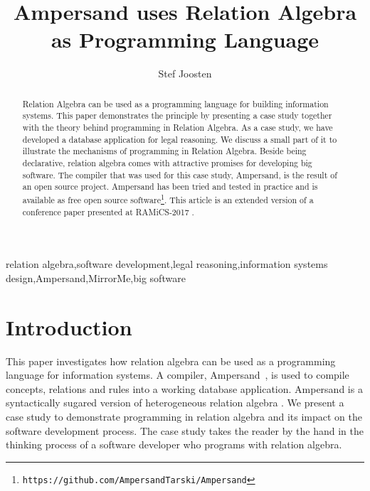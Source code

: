 \documentclass{elsarticle}
\begin{document}
\title{Ampersand uses Relation Algebra as Programming Language}
\author[ou,ordina]{Stef Joosten}
\address[ou]{Open Universiteit Nederland, Postbus 2960, 6401 DL Heerlen, the Netherlands}
\address[ordina]{Ordina NV,  Nieuwegein, the Netherlands}

\begin{abstract}
	Relation Algebra can be used as a programming language for building information systems.
	This paper demonstrates the principle by presenting a case study together with the theory behind programming in Relation Algebra.
	As a case study, we have developed a database application for legal reasoning.
	We discuss a small part of it to illustrate the mechanisms of programming in Relation Algebra.
	Beside being declarative, relation algebra comes with attractive promises for developing big software.
	The compiler that was used for this case study, Ampersand, is the result of an open source project.
	Ampersand has been tried and tested in practice and is available as free open source software\footnote{\tt https://github.com/AmpersandTarski/Ampersand}.
	This article is an extended version of a conference paper presented at RAMiCS-2017 \cite{JoostenRAMiCS2017}.
\end{abstract}

\begin{keyword}
relation algebra\sep software development\sep legal reasoning\sep information systems design\sep Ampersand\sep MirrorMe\sep big software
\end{keyword}
\maketitle

\section{Introduction}
\label{sct:Introduction}
	This paper investigates how relation algebra can be used as a programming language for information systems.
	A compiler, Ampersand~\cite{Michels2011}, is used to compile concepts, relations and rules into a working database application.
	Ampersand is a syntactically sugared version of heterogeneous relation algebra \cite{Schmidt1997}.
	We present a case study to demonstrate programming in relation algebra and its impact on the software development process.
	The case study takes the reader by the hand in the thinking process of a software developer who programs with relation algebra.
\end{document}
